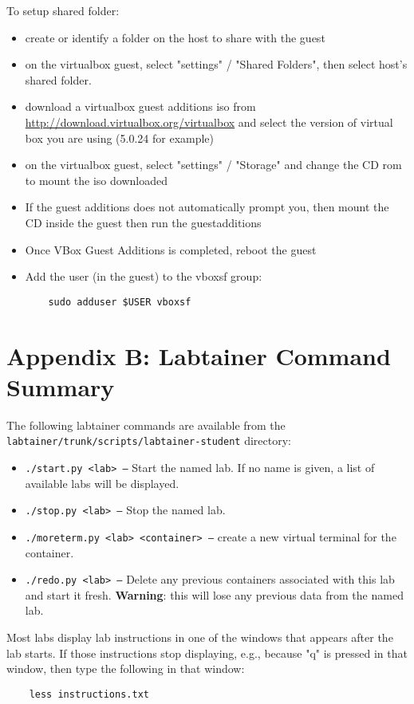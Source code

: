 \documentclass[12pt]{article}
\begin{document}
To setup shared folder:
\begin{itemize}
\item create or identify a folder on the host to share with the guest
\item on the virtualbox guest, select "settings" / "Shared Folders",
then select host's shared folder.

\item download a virtualbox guest additions iso from 
\url{http://download.virtualbox.org/virtualbox} and select
the version of virtual box you are using (5.0.24 for example)

\item on the virtualbox guest, select "settings" / "Storage" and
change the CD rom to mount the iso downloaded

\item If the guest additions does not automatically prompt you, then mount the CD 
inside the guest then run the guestadditions

\item Once VBox Guest Additions is completed, reboot the guest

\item Add the user (in the guest) to the vboxsf group:
\begin{verbatim}
    sudo adduser $USER vboxsf
\end{verbatim}
\end{itemize}

\newpage
\appendix 
\section {Appendix B: Labtainer Command Summary}
\label{sec:appendixB}
The following labtainer commands are available from the \texttt{labtainer/trunk/scripts/labtainer-student}
directory:
\begin{itemize}
\item \texttt{./start.py <lab> --}
Start the named lab.  If no name is given, a list of available labs will be displayed.
\item \texttt{./stop.py <lab> --} Stop the named lab.
\item \texttt{./moreterm.py <lab> <container> --} create a new virtual terminal for the container.
\item \texttt{./redo.py <lab> --}
Delete any previous containers associated with this lab and start it fresh.  \textbf{Warning}: this will lose any
previous data from the named lab.
\end{itemize}

Most labs display lab instructions in one of the windows that appears after the lab starts.  If those instructions
stop displaying, e.g., because "q" is pressed in that window, then type the following in that window:
\begin{verbatim}
    less instructions.txt
\end{verbatim}
\end{document}
